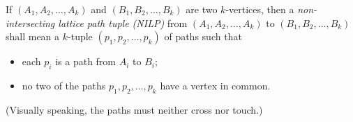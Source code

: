 \documentclass[reqno]{amsart}
\newcommand{\0}{\phantom{c}}
\DeclareMathOperator{\wt}{wt} %
\let\sumnonlimits\sum
\renewcommand{\sum}{\sumnonlimits\limits}
\newcommand{\set}[1]{\left\{ #1 \right\}}
\newcommand{\tup}[1]{\left( #1 \right)}
\newcommand{\defn}[1]{{\color{darkred}\emph{#1}}} %
\theoremstyle{plain}
\theoremstyle{definition}
\numberwithin{equation}{section}
\newcommand{\Travis}[1]{\todo[size=\tiny,inline,color=blue!30]{#1
      \\ \hfill --- Travis}}
\begin{document}
\begin{comment}
\Travis{This is almost certainly well-known and understood and could be an easy exercise for your 4707 students. This is also likely in Stanley (maybe implicitly/left to the reader). I think we should remove it (not even include in the long version).}

\begin{proof}[Proof of~\eqref{eq.LGV.single-paths}.]
Let $A = (a,b)$ and $B = (c,d)$ be two vertices.
If $p$ is a path from $A$ to $B$, then $p$ must have exactly $c-a$ east-steps, and the $y$-coordinates of these
east-steps must belong to the interval $\set{b,b+1,\dotsc,d}$.
Let $\bigl(  y_1(p), y_2(p), \dotsc, y_{c-a}(p) \bigr)$ be the weakly increasing $(c-a)$-tuple of elements of $\set{b,b+1, \dotsc, d}$ corresponding to the $y$-coordinates of the $c-a$ east-steps of $p$ (from left to right).
Moreover, $p$ can be uniquely reconstructed from this $(c-a)$-tuple (since these $(c-a)$-tuple determines the east-steps of $p$).
Conversely, any weakly increasing $(c-a)$-tuple of elements of $\set{b, b+1, \dotsc,d}$ has the form $\bigl(  y_1(p), y_2(p), \dotsc, y_{c-a}(p) \bigr)$ for a unique path $p$ from $A$ to $B$.
Thus, there is a bijection between the paths $p$ from $A$ to $B$ and the weakly increasing $(c-a)$-tuples of elements of $\set{b, b+1, \dotsc, d}$.
This yields
\begin{align*}
\sum_{p \in N(A,B)} \wt(p) & = \sum_{\substack{ \tup{k_1,k_2,\ldots,k_{c-a}} \text{ is a weakly increasing} \\ (c-a)\text{-tuple of elements of }\set{b,b+1,\dotsc,d} }} x_{k_1} x_{k_2} \cdots x_{k_{c-a}}
\\ & = h_{c-a}(x_{b}, x_{b+1}, \dotsc, x_{d}).
\end{align*}
\end{proof}
\end{comment}

If $\tup{A_1, A_2, \dotsc, A_k}$ and $\tup{B_1, B_2, \dotsc, B_k}$ are two $k$-vertices, then a \defn{non-intersecting lattice path tuple (NILP)} from $\tup{A_1, A_2, \dotsc, A_k}$ to $\tup{B_1, B_2, \dotsc, B_k}$ shall mean a $k$-tuple $\tup{p_1, p_2, \dotsc, p_k}$ of paths such that
\begin{itemize}
\item each $p_i$ is a path from $A_i$ to $B_i$;
\item no two of the paths $p_1, p_2, \dotsc, p_k$ have a vertex in common.
\end{itemize}
(Visually speaking, the paths must neither cross nor touch.)
\end{document}
